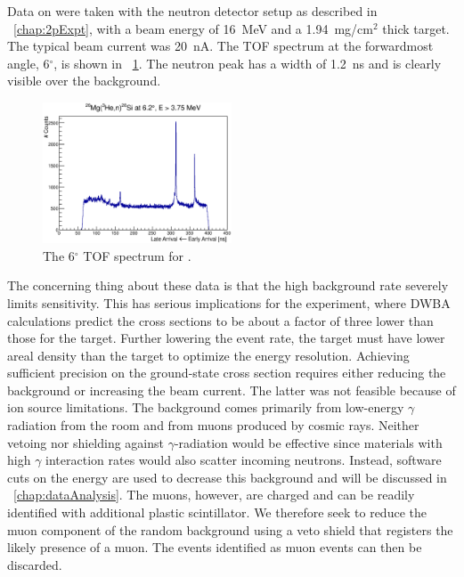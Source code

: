 Data on \MgReaction were taken with the neutron detector setup as described in {\chap}~\ref{chap:2pExpt}, with a beam energy of 16~MeV and a 1.94~mg/cm$^2$ thick  target.  The typical beam current was 20~nA. The TOF spectrum at the forwardmost angle, 6$^{\circ}$, is shown in {\fig}~\ref{fig:MgTOF}.  The neutron peak has a width of 1.2~ns and is clearly visible over the background. 
\begin{figure}[!htbp]
\centering
\includegraphics[width=0.5\textwidth]{figures/26Mg_veryOld.eps}
\caption{The 6$^{\circ}$ TOF spectrum for \MgReaction.}
\label{fig:MgTOF}
\end{figure}

The concerning thing about these data is that the high background rate severely limits sensitivity.  This has serious implications for the \GeTargets experiment, where DWBA calculations predict the cross sections to be about a factor of three lower than those for the  target.  Further lowering the event rate, the \GeTargets target must have lower areal density than the  target to optimize the energy resolution.  Achieving sufficient precision on the ground-state cross section requires either reducing the background or increasing the beam current.  The latter was not feasible because of ion source limitations.  The background comes primarily from low-energy $\gamma$ radiation from the room and from muons produced by cosmic rays.  Neither vetoing nor shielding against $\gamma$-radiation would be effective since materials with high $\gamma$ interaction rates would also scatter incoming neutrons.  Instead, software cuts on the energy are used to decrease this background and will be discussed in {\chap}~\ref{chap:dataAnalysis}.  The muons, however, are charged and can be readily identified with additional plastic scintillator.  We therefore seek to reduce the muon component of the random background using a veto shield that registers the likely presence of a muon.  The events identified as muon events can then be discarded.  

